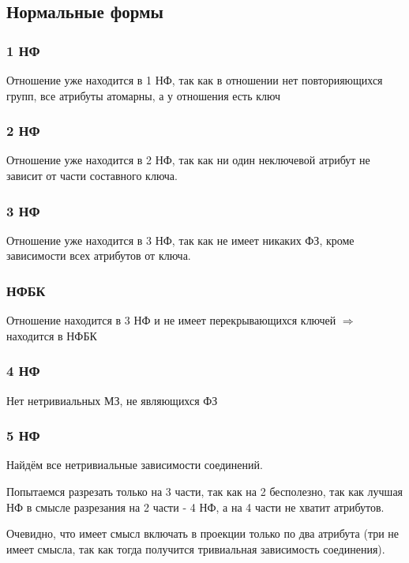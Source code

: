 \documentclass{article}
\begin{document}
\subsection{Нормальные формы}

\subsubsection{1 НФ}

Отношение уже находится в 1 НФ, так как в отношении нет повторияющихся групп, все атрибуты атомарны, а у отношения есть ключ

\subsubsection{2 НФ}

Отношение уже находится в 2 НФ, так как ни один неключевой атрибут не зависит от части составного ключа.

\subsubsection{3 НФ}

Отношение уже находится в 3 НФ, так как не имеет никаких ФЗ, кроме зависимости всех атрибутов от ключа.

\subsubsection{НФБК}

Отношение находится в 3 НФ и не имеет перекрывающихся ключей $\Rightarrow$ находится в НФБК

\subsubsection{4 НФ}

Нет нетривиальных МЗ, не являющихся ФЗ

\subsubsection{5 НФ}


	Найдём все нетривиальные зависимости соединений.
	
	Попытаемся разрезать только на 3 части, так как на 2 бесполезно, так как лучшая НФ в смысле разрезания на 2 части - 4 НФ, а на 4 части не хватит атрибутов.
	
	Очевидно, что имеет смысл включать в проекции только по два атрибута (три не имеет смысла, так как тогда получится тривиальная зависимость соединения).
	
\end{document}
